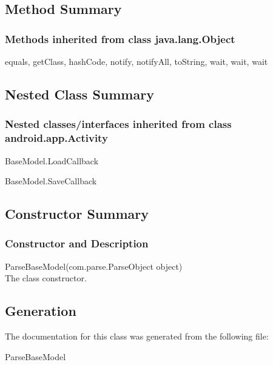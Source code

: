 \subsection{Method Summary}

\subsubsection{Methods inherited from class java.lang.Object}

equals, getClass, hashCode, notify, notifyAll, toString, wait, wait, wait\\



\subsection{Nested Class Summary}

\subsubsection{Nested classes/interfaces inherited from class android.app.Activity}
\begin{DoxyCompactItemize}
\item  \hypertarget{class_BaseModel.Android.LoadCallBack}{BaseModel.LoadCallback}
\item  \hypertarget{class_BaseModel.Android.SaveCallback}{BaseModel.SaveCallback}
\end{DoxyCompactItemize} 


\subsection{Constructor Summary}

\subsubsection{Constructor and Description}
ParseBaseModel(com.parse.ParseObject object)\\
The class constructor.\\


\subsection{Generation}
The documentation for this class was generated from the following file\-:
\begin{DoxyCompactItemize}
\item ParseBaseModel
\end{DoxyCompactItemize} 









